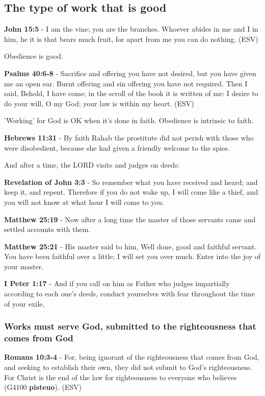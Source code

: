 \documentclass[11pt]{article}
\begin{document}
\subsection{The type of work that is good}
\label{sec:orgd0fd71c}
\textbf{John 15:5} - I am the vine; you are the branches. Whoever abides in me and I in him, he it is that bears much fruit, for apart from me you can do nothing. (ESV)

Obedience is good.

\textbf{Psalms 40:6-8} - Sacrifice and offering you have not desired, but you have given me an open ear. Burnt offering and sin offering you have not required. Then I said, Behold, I have come; in the scroll of the book it is written of me: I desire to do your will, O my God; your law is within my heart. (ESV)

'Working' for God is OK when it's done in faith.
Obedience is intrinsic to faith.

\textbf{Hebrews 11:31} - By faith Rahab the prostitute did not perish with those who were disobedient, because she had given a friendly welcome to the spies.

And after a time, the LORD visits and judges on deeds:

\textbf{Revelation of John 3:3} - So remember what you have received and heard; and keep it, and repent. Therefore if you do not wake up, I will come like a thief, and you will not know at what hour I will come to you.

\textbf{Matthew 25:19} - Now after a long time the master of those servants came and settled accounts with them.

\textbf{Matthew 25:21} - His master said to him, Well done, good and faithful servant. You have been faithful over a little; I will set you over much. Enter into the joy of your master.

\textbf{I Peter 1:17} - And if you call on him as Father who judges impartially according to each one's deeds, conduct yourselves with fear throughout the time of your exile,

\subsubsection{Works must serve God, submitted to the righteousness that comes from God}
\label{sec:orgc8761e9}

\textbf{Romans 10:3-4} - For, being ignorant of the righteousness that comes from God, and seeking to establish their own, they did not submit to God's righteousness. For Christ is the end of the law for righteousness to everyone who believes (G4100 \textbf{pisteuo}). (ESV)
\end{document}
